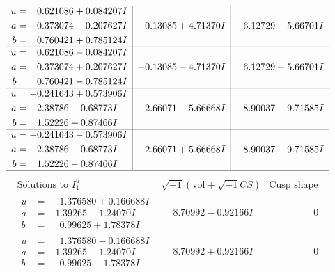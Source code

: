 \documentclass[1p]{elsarticle_modified}
\theoremstyle{definition}
\newcommand{\I}{\sqrt{-1}}
\begin{document}
$$\begin{array}{c|c|c}
\begin{aligned}
u &= \phantom{-}0.621086 + 0.084207 I \\
a &= \phantom{-}0.373074 - 0.207627 I \\
b &= \phantom{-}0.760421 + 0.785124 I\end{aligned}
 & -0.13085 + 4.71370 I & \phantom{-}6.12729 - 5.66701 I \\ \hline\begin{aligned}
u &= \phantom{-}0.621086 - 0.084207 I \\
a &= \phantom{-}0.373074 + 0.207627 I \\
b &= \phantom{-}0.760421 - 0.785124 I\end{aligned}
 & -0.13085 - 4.71370 I & \phantom{-}6.12729 + 5.66701 I \\ \hline\begin{aligned}
u &= -0.241643 + 0.573906 I \\
a &= \phantom{-}2.38786 + 0.68773 I \\
b &= \phantom{-}1.52226 + 0.87466 I\end{aligned}
 & \phantom{-}2.66071 - 5.66668 I & \phantom{-}8.90037 + 9.71585 I \\ \hline\begin{aligned}
u &= -0.241643 - 0.573906 I \\
a &= \phantom{-}2.38786 - 0.68773 I \\
b &= \phantom{-}1.52226 - 0.87466 I\end{aligned}
 & \phantom{-}2.66071 + 5.66668 I & \phantom{-}8.90037 - 9.71585 I\\
 \hline 
 \end{array}$$\newpage$$\begin{array}{c|c|c}  
\text{Solutions to }I^u_{1}& \I (\text{vol} + \sqrt{-1}CS) & \text{Cusp shape}\\
 \hline 
\begin{aligned}
u &= \phantom{-}1.376580 + 0.166688 I \\
a &= -1.39265 + 1.24070 I \\
b &= \phantom{-}0.99625 + 1.78378 I\end{aligned}
 & \phantom{-}8.70992 - 0.92166 I & \phantom{-0.000000 } 0 \\ \hline\begin{aligned}
u &= \phantom{-}1.376580 - 0.166688 I \\
a &= -1.39265 - 1.24070 I \\
b &= \phantom{-}0.99625 - 1.78378 I\end{aligned}
 & \phantom{-}8.70992 + 0.92166 I & \phantom{-0.000000 } 0 \\ \hline\begin{aligned}

\end{aligned}
\end{array}$$
\end{document}
